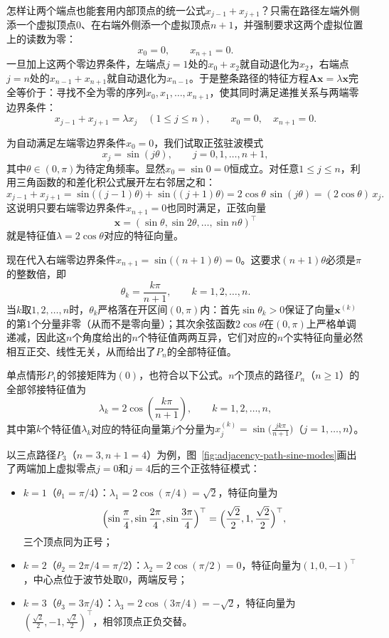怎样让两个端点也能套用内部顶点的统一公式$x_{j-1}+x_{j+1}$？只需在路径左端外侧添一个虚拟顶点$0$、在右端外侧添一个虚拟顶点$n+1$，并强制要求这两个虚拟位置上的读数为零：
\[
x_0=0,\qquad x_{n+1}=0.
\]
一旦加上这两个零边界条件，左端点$j=1$处的$x_0+x_2$就自动退化为$x_2$，右端点$j=n$处的$x_{n-1}+x_{n+1}$就自动退化为$x_{n-1}$。于是整条路径的特征方程$\bm A\bm x=\lambda\bm x$完全等价于：寻找不全为零的序列$x_0,x_1,\ldots,x_{n+1}$，使其同时满足递推关系与两端零边界条件：
\[
x_{j-1}+x_{j+1}=\lambda x_j\quad(1\leq j\leq n),
\qquad x_0=0,\quad x_{n+1}=0.
\]

为自动满足左端零边界条件$x_0=0$，我们试取正弦驻波模式
\[
x_j=\sin(j\theta),\qquad j=0,1,\ldots,n+1,
\]
其中$\theta\in(0,\pi)$为待定角频率。显然$x_0=\sin 0=0$恒成立。对任意$1\leq j\leq n$，利用三角函数的和差化积公式展开左右邻居之和：
\[
x_{j-1}+x_{j+1}
=\sin\bigl((j-1)\theta\bigr)+\sin\bigl((j+1)\theta\bigr)
=2\cos\theta\,\sin(j\theta)
=(2\cos\theta)\,x_j.
\]
这说明只要右端零边界条件$x_{n+1}=0$也同时满足，正弦向量
\[
\bm x=(\sin\theta,\sin 2\theta,\ldots,\sin n\theta)^\top
\]
就是特征值$\lambda=2\cos\theta$对应的特征向量。

现在代入右端零边界条件$x_{n+1}=\sin\bigl((n+1)\theta\bigr)=0$。这要求$(n+1)\theta$必须是$\pi$的整数倍，即
\[
\theta_k=\frac{k\pi}{n+1},\qquad k=1,2,\ldots,n.
\]
当$k$取$1,2,\ldots,n$时，$\theta_k$严格落在开区间$(0,\pi)$内：首先$\sin\theta_k>0$保证了向量$\bm x^{(k)}$的第$1$个分量非零（从而不是零向量）；其次余弦函数$2\cos\theta$在$(0,\pi)$上严格单调递减，因此这$n$个角度给出的$n$个特征值两两互异，它们对应的$n$个实特征向量必然相互正交、线性无关，从而给出了$P_n$的全部特征值。

\begin{theorem}[路径的邻接谱]
\label{prop:adjacency-path-spectrum}
单点情形$P_1$的邻接矩阵为$(0)$，也符合以下公式。$n$个顶点的路径$P_n$（$n\geq 1$）的全部邻接特征值为
\begin{equation}
\lambda_k=2\cos\left(\frac{k\pi}{n+1}\right),
\qquad k=1,2,\ldots,n,
\label{eq:adjacency-path-spectrum}
\end{equation}
其中第$k$个特征值$\lambda_k$对应的特征向量第$j$个分量为$x_j^{(k)}=\sin\bigl(\frac{jk\pi}{n+1}\bigr)$（$j=1,\ldots,n$）。
\end{theorem}

以三点路径$P_3$（$n=3,n+1=4$）为例，图~\ref{fig:adjacency-path-sine-modes}画出了两端加上虚拟零点$j=0$和$j=4$后的三个正弦特征模式：
\begin{itemize}
\item $k=1$（$\theta_1=\pi/4$）：$\lambda_1=2\cos(\pi/4)=\sqrt{2}$，特征向量为
\[
\Bigl(\sin\frac{\pi}{4},\sin\frac{2\pi}{4},\sin\frac{3\pi}{4}\Bigr)^\top
=\Bigl(\frac{\sqrt{2}}{2},1,\frac{\sqrt{2}}{2}\Bigr)^\top,
\]
三个顶点同为正号；
\item $k=2$（$\theta_2=2\pi/4=\pi/2$）：$\lambda_2=2\cos(\pi/2)=0$，特征向量为$(1,0,-1)^\top$，中心点位于波节处取$0$，两端反号；
\item $k=3$（$\theta_3=3\pi/4$）：$\lambda_3=2\cos(3\pi/4)=-\sqrt{2}$，特征向量为$(\frac{\sqrt{2}}{2},-1,\frac{\sqrt{2}}{2})^\top$，相邻顶点正负交替。
\end{itemize}

